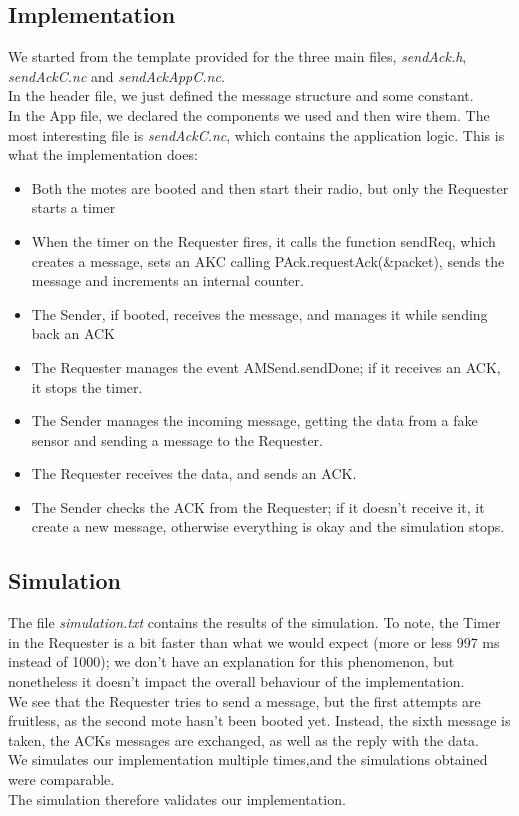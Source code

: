 \documentclass[12pt]{article}
\begin{document}
\subsection{Implementation}

We started from the template provided for the three main files, \emph{sendAck.h}, \emph{sendAckC.nc} and \emph{sendAckAppC.nc}. \\
In the header file, we just defined the message structure and some constant.\\
In the App file, we declared the components we used and then wire them. 
The most interesting file is \emph{sendAckC.nc}, which contains the application logic. This is what the implementation does:\\
\begin{itemize}
\item Both the motes are booted and then start their radio, but only the Requester starts a timer
\item When the timer on the Requester fires, it calls the function sendReq, which creates a message, sets an AKC calling PAck.requestAck(\&packet), sends the message and increments an internal counter. 
\item The Sender, if booted, receives the message, and manages it while sending back an ACK
\item The Requester manages the event AMSend.sendDone; if it receives an ACK, it stops the timer.
\item The Sender manages the incoming message, getting the data from a fake sensor and sending a message to the Requester.
\item The Requester receives the data, and sends an ACK.
\item The Sender checks the ACK from the Requester; if it doesn't receive it, it create a new message, otherwise everything is okay and the simulation stops. 
\end{itemize}
\subsection{Simulation}

The file \emph{simulation.txt} contains the results of the simulation. To note, the Timer in the Requester is a bit faster than what we would expect (more or less 997 ms instead of 1000); we don't have an explanation for this phenomenon, but nonetheless it doesn't impact the overall behaviour of the implementation.\\
We see that the Requester tries to send a message, but the first attempts are fruitless, as the second mote hasn't been booted yet. Instead, the sixth message is taken, the ACKs messages are exchanged, as well as the reply with the data. \\
We simulates our implementation multiple times,and the simulations obtained were comparable.\\
The simulation therefore validates our implementation.
\end{document}
